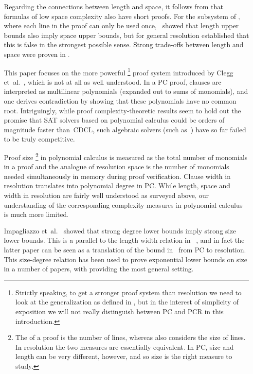 \documentclass[11pt]{article}
\numberwithin{equation}{section}
\theoremstyle{definition}
\theoremstyle{plain}
\providecommand{\etal}{et~al.}
\begin{document}
Regarding the connections between length and space,
it follows from
\cite{AD08CombinatoricalCharacterization}
that formulas of low space complexity also have short proofs.
For the subsystem of ,
where each line in the proof can only be used once,
\cite{ET01SpaceBounds}~showed 
%
that length upper bounds also imply space upper bounds,
but for general resolution
\cite{BN08ShortProofs} established that this is false in the
strongest possible sense. 
%
Strong trade-offs between length and space were proven in
\cite{BN11UnderstandingSpace,BBI16TimeSpace}.

This paper focuses on the more powerful
%
%
\footnote{Strictly speaking, to get a stronger proof system than
  resolution we need to look at the generalization
%
%
  as defined in
  \cite{ABRW02SpaceComplexity},
%
%
  but in the interest of simplicity of exposition we will not really
  distinguish between PC and PCR in this introduction.
}
proof system introduced by Clegg \etal~\cite{CEI96Groebner},
which is not at all as well understood.
In a PC proof, clauses are interpreted as multilinear polynomials
(expanded out to sums of monomials),
and one derives contradiction by showing that these polynomials have
no common root. 
%
Intriguingly, while proof complexity-theoretic results seem to hold
out the promise that SAT solvers based on 
%
%
polynomial calculus could be orders of
magnitude faster than~CDCL, such algebraic solvers 
%
(such as~\cite{BD09Polybori})
have so far failed to be truly competitive.

Proof size%
\footnote{The  of a proof is the
  number of lines, whereas  also   considers 
  the size of lines. In resolution the two measures are
  essentially equivalent. In PC, %
  size and length can be
  very different, however, and so size is the right measure to study.}
in 
%
polynomial calculus   
is measured as the total number of monomials in a proof
and the analogue of resolution space is the number of monomials needed 
%
simultaneously in memory during
proof verification. Clause width in resolution
translates into polynomial degree in PC.
While length, space and width in resolution are fairly well
understood as surveyed above,
our understanding of the corresponding
complexity measures in 
%
polynomial calculus is much more limited.

Impagliazzo \etal~\cite{IPS99LowerBounds}
showed that strong degree lower bounds imply strong size lower bounds.
This is a parallel to the length-width relation 
%
in~%
\cite{BW01ShortProofs},
and in fact the latter paper can be seen as a 
translation of   the bound in~%
\cite{IPS99LowerBounds} from
PC 
%
to resolution.
This size-degree relation has been used to prove exponential lower
bounds on  size in a number of papers, with
%
\cite{AR03LowerBounds,MN15GeneralizedMethodDegree}
%
providing the most general setting.
\end{document}
